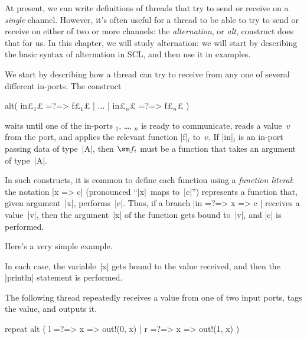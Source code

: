 At present, we can write definitions of threads that try to send or receive on
a \emph{single} channel.  However, it's often useful for a thread to be able
to try to send or receive on either of two or more channels: the
\emph{alternation}, or \emph{alt}, construct does that for us.
%
In this chapter, we will study alternation: we will start by describing the
basic syntax of alternation in SCL, and then use it in examples.


We start by describing how a thread can try to receive from any one of several
different in-ports.  The construct
%
\begin{scala}
  alt( in£$_1$£ =?=> {f£$_1$£} | ... | in£$_n$£ =?=> {f£$_n$£} )
\end{scala}
%
waits until one of the in-ports $_1$, \ldots, $_n$
is ready to communicate, reads a value~$v$ from the port, and applies the
relevant function |f|$_i$ to~$v$.  If |in|$_i$ is an in-port passing data
of type~|A|, then $\sm f_i$ must be a function that takes an argument of
type~|A|. 

In such constructs, it is common to define each function using a
\emph{function literal}: the notation |x => c| (pronounced ``|x|~maps
to~|c|'') represents a function that, given argument~|x|, performs~|c|.  Thus,
if a branch |in =?=> { x => c }| receives a value~|v|, then the argument~|x|
of the function gets bound to~|v|, and |c| is performed.

Here's a very simple example. 
%
%
In each case, the variable~|x| gets bound to the value received, and then the
|println| statement is performed. 


The following thread repeatedly receives a value from one of two input ports,
tags the value, and outputs it.
%
\begin{scala}
  repeat{
    alt ( l =?=> { x => out!(0, x) } | r =?=> { x => out!(1, x) } )
  }
\end{scala}

%


